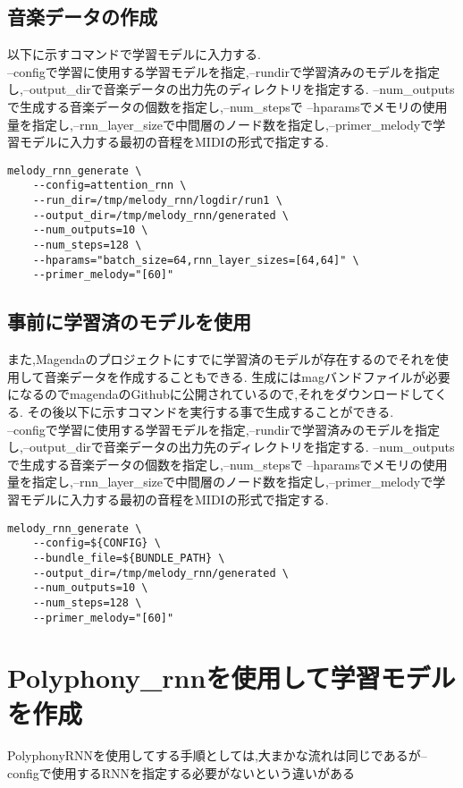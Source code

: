 \subsection{音楽データの作成}
以下に示すコマンドで学習モデルに入力する.\\
--configで学習に使用する学習モデルを指定,--rundirで学習済みのモデルを指定し,--output\_dirで音楽データの出力先のディレクトリを指定する.
--num\_outputsで生成する音楽データの個数を指定し,--num\_stepsで
--hparamsでメモリの使用量を指定し,--rnn\_layer\_sizeで中間層のノード数を指定し,--primer\_melodyで学習モデルに入力する最初の音程をMIDIの形式で指定する.\\
\begin{lstlisting}[basicstyle=\ttfamily\footnotesize,frame=single]
    melody_rnn_generate \
    --config=attention_rnn \
    --run_dir=/tmp/melody_rnn/logdir/run1 \
    --output_dir=/tmp/melody_rnn/generated \
    --num_outputs=10 \
    --num_steps=128 \
    --hparams="batch_size=64,rnn_layer_sizes=[64,64]" \
    --primer_melody="[60]"
\end{lstlisting}
\subsection{事前に学習済のモデルを使用}
また,Magendaのプロジェクトにすでに学習済のモデルが存在するのでそれを使用して音楽データを作成することもできる.
生成にはmagバンドファイルが必要になるのでmagendaのGithubに公開されているので,それをダウンロードしてくる.
その後以下に示すコマンドを実行する事で生成することができる.\\
--configで学習に使用する学習モデルを指定,--rundirで学習済みのモデルを指定し,--output\_dirで音楽データの出力先のディレクトリを指定する.
--num\_outputsで生成する音楽データの個数を指定し,--num\_stepsで
--hparamsでメモリの使用量を指定し,--rnn\_layer\_sizeで中間層のノード数を指定し,--primer\_melodyで学習モデルに入力する最初の音程をMIDIの形式で指定する.\\
\begin{lstlisting}[basicstyle=\ttfamily\footnotesize,frame=single]
    melody_rnn_generate \
    --config=${CONFIG} \
    --bundle_file=${BUNDLE_PATH} \
    --output_dir=/tmp/melody_rnn/generated \
    --num_outputs=10 \
    --num_steps=128 \
    --primer_melody="[60]"
\end{lstlisting}
\newpage
\section{Polyphony\_rnnを使用して学習モデルを作成}
PolyphonyRNNを使用してする手順としては,大まかな流れは同じであるが--configで使用するRNNを指定する必要がないという違いがある
